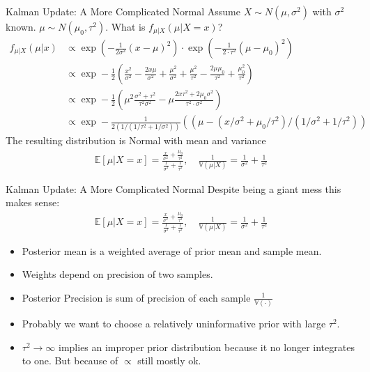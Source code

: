 \documentclass[aspectratio=169]{beamer}
\begin{document}
\begin{frame}{Kalman Update: A More Complicated Normal}
Assume $X \sim N(\mu,\sigma^2)$ with $\sigma^2$ known. $\mu \sim N(\mu_0,\tau^2)$. What is $f_{\mu | X}(\mu | X=x)$?
\begin{align*}
f_{\mu|X}(\mu | x) &\propto \exp \left(-\frac{1}{2 \sigma^{2}}(x-\mu)^{2}\right) \cdot \exp \left(-\frac{1}{2 \cdot \tau^{2}}\left(\mu-\mu_{0}\right)^{2}\right)\\
&\propto \exp -\frac{1}{2}\left(\frac{x^{2}}{\sigma^{2}}-\frac{2 x \mu}{\sigma^{2}}+\frac{\mu^{2}}{\sigma^{2}}+\frac{\mu^{2}}{\tau^{2}}-\frac{2 \mu \mu_{0}}{\tau^{2}}+\frac{\mu_{0}^{2}}{\tau^{2}}\right)\\
&\propto \exp -\frac{1}{2}\left(\mu^{2} \frac{\sigma^{2}+\tau^{2}}{\tau^{2} \sigma^{2}}-\mu \frac{2 x \tau^{2}+2 \mu_{0} \sigma^{2}}{\tau^{2} \cdot \sigma^{2}}\right)\\
&\propto \exp -\frac{1}{2\left(1 /\left(1 / \tau^{2}+1 / \sigma^{2}\right)\right)}\left(\left(\mu-\left(x / \sigma^{2}+\mu_{0} / \tau^{2}\right) /\left(1 / \sigma^{2}+1 / \tau^{2}\right)\right)\right.
\end{align*}
The resulting distribution is Normal with mean and variance
\begin{align*}
\mathbb{E}[\mu | X=x]=\frac{\frac{x}{\sigma^{2}}+\frac{\mu_{0}}{\tau^{2}}}{\frac{1}{\sigma^{2}}+\frac{1}{\tau^{2}}}, \quad \frac{1}{\mathbb{V}(\mu | X)}=\frac{1}{\sigma^{2}}+\frac{1}{\tau^{2}}
\end{align*}
\end{frame}


\begin{frame}{Kalman Update: A More Complicated Normal}
Despite being a giant mess this makes sense:
\begin{align*}
\mathbb{E}[\mu | X=x]=\frac{\frac{x}{\sigma^{2}}+\frac{\mu_{0}}{\tau^{2}}}{\frac{1}{\sigma^{2}}+\frac{1}{\tau^{2}}}, \quad \frac{1}{\mathbb{V}(\mu | X)}=\frac{1}{\sigma^{2}}+\frac{1}{\tau^{2}}
\end{align*}
\begin{itemize}
\item Posterior mean is a weighted average of \alert{prior mean} and \alert{sample mean}.
\item Weights depend on \alert{precision} of two samples.
\item Posterior \alert{Precision} is sum of precision of each sample $\frac{1}{\mathbb{V}(\cdot)}$
\item Probably we want to choose a relatively \alert{uninformative} prior with large $\tau^2$.
\item $\tau^2 \rightarrow \infty$ implies an \alert{improper prior distribution} because it no longer integrates to one. But because of $\propto$ still mostly ok.
\end{itemize}
\end{frame}
\end{document}
